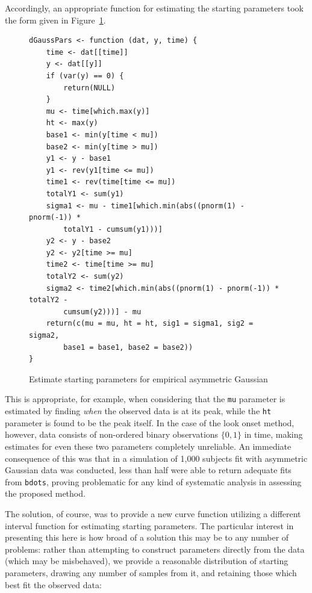 \documentclass{article}
\newcommand{\xt}{\texttt}%
\begin{document}
Accordingly, an appropriate function for estimating the starting parameters took the form given in Figure~\ref{fig:gauss_form}.


\begin{singlespace}
\begin{figure}[H]
\centering
\begin{BVerbatim}
dGaussPars <- function (dat, y, time) {
    time <- dat[[time]]
    y <- dat[[y]]
    if (var(y) == 0) {
        return(NULL)
    }
    mu <- time[which.max(y)]
    ht <- max(y)
    base1 <- min(y[time < mu])
    base2 <- min(y[time > mu])
    y1 <- y - base1
    y1 <- rev(y1[time <= mu])
    time1 <- rev(time[time <= mu])
    totalY1 <- sum(y1)
    sigma1 <- mu - time1[which.min(abs((pnorm(1) - pnorm(-1)) * 
        totalY1 - cumsum(y1)))]
    y2 <- y - base2
    y2 <- y2[time >= mu]
    time2 <- time[time >= mu]
    totalY2 <- sum(y2)
    sigma2 <- time2[which.min(abs((pnorm(1) - pnorm(-1)) * totalY2 - 
        cumsum(y2)))] - mu
    return(c(mu = mu, ht = ht, sig1 = sigma1, sig2 = sigma2, 
        base1 = base1, base2 = base2))
}
\end{BVerbatim}
\caption{Estimate starting parameters for empirical asymmetric Gaussian}
\label{fig:gauss_form}
\end{figure}
\end{singlespace}

This is appropriate, for example, when considering that the \xt{mu} parameter is estimated by finding \textit{when} the observed data is at its peak, while the \xt{ht} parameter is found to be the peak itself. In the case of the look onset method, however, data consists of non-ordered binary observations $\{0,1\}$ in time, making estimates for even these two parameters completely unreliable. An immediate consequence of this was that in a simulation of 1,000 subjects fit with asymmetric Gaussian data was conducted, less than half were able to return adequate fits from \xt{bdots}, proving problematic for any kind of systematic analysis in assessing the proposed method.

The solution, of course, was to provide a new curve function utilizing a different interval function for estimating starting parameters. The particular interest in presenting this here is how broad of a solution this may be to any number of problems: rather than attempting to construct parameters directly from the data (which may be misbehaved), we provide a reasonable distribution of starting parameters, drawing any number of samples from it, and retaining those which best fit the observed data:
\end{document}
